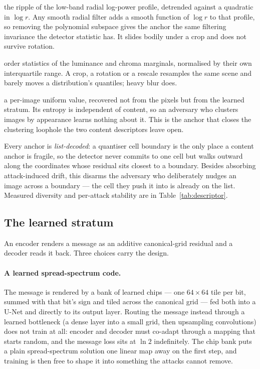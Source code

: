\documentclass[10pt,twocolumn]{article}
\theoremstyle{definition}
\theoremstyle{remark}
\begin{document}
\begin{description}[leftmargin=0.9em,itemsep=1pt,topsep=2pt]
\item[spectral] the ripple of the low-band radial log-power profile, detrended
  against a quadratic in $\log r$. Any smooth radial filter adds a smooth
  function of $\log r$ to that profile, so removing the polynomial subspace gives
  the anchor the same filtering invariance the detector statistic has. It slides
  bodily under a crop and does not survive rotation.
\item[histogram] order statistics of the luminance and chroma marginals,
  normalised by their own interquartile range. A crop, a rotation or a rescale
  resamples the same scene and barely moves a distribution's quantiles; heavy
  blur does.
\item[nonce] a per-image uniform value, recovered not from the pixels but from
  the learned stratum. Its entropy is independent of content, so an adversary who
  clusters images by appearance learns nothing about it. This is the anchor that
  closes the clustering loophole the two content descriptors leave open.
\end{description}

Every anchor is \emph{list-decoded}: a quantiser cell boundary is the only place
a content anchor is fragile, so the detector never commits to one cell but walks
outward along the coordinates whose residual sits closest to a boundary. Besides
absorbing attack-induced drift, this disarms the adversary who deliberately
nudges an image across a boundary --- the cell they push it into is already on
the list. Measured diversity and per-attack stability are in
Table~\ref{tab:descriptor}.

\subsection{The learned stratum}
\label{sec:learned}

An encoder renders a message as an additive canonical-grid residual and a decoder
reads it back. Three choices carry the design.

\paragraph{A learned spread-spectrum code.} The message is rendered by a bank of
learned chips --- one $64\times64$ tile per bit, summed with that bit's sign and
tiled across the canonical grid --- fed both into a U-Net and directly to its
output layer. Routing the message instead through a learned bottleneck (a dense
layer into a small grid, then upsampling convolutions) does not train at all:
encoder and decoder must co-adapt through a mapping that starts random, and the
message loss sits at $\ln 2$ indefinitely. The chip bank puts a plain
spread-spectrum solution one linear map away on the first step, and training is
then free to shape it into something the attacks cannot remove.
\end{document}
